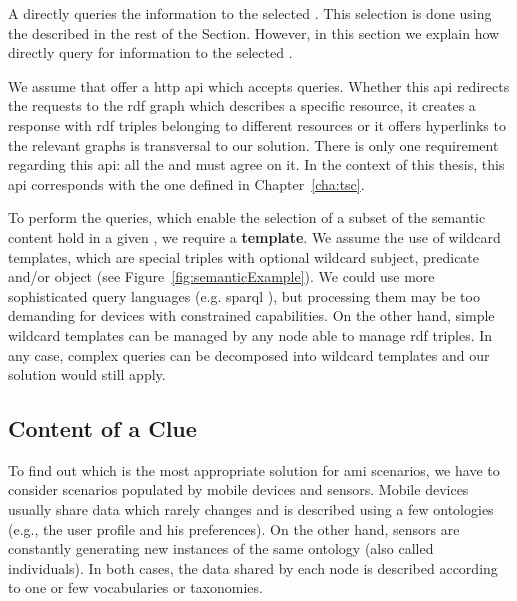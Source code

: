 A \consumer{} directly queries the information to the selected \providers{}.
This selection is done using the \clues{} described in the rest of the Section.
However, in this section we explain how \consumers{} directly query for information to the selected \providers{}.

We assume that \providers{} offer a \ac{http} \ac{api} which accepts queries. %
Whether this \ac{api} redirects the requests to the \ac{rdf} graph which describes a specific resource,
it creates a response with \ac{rdf} triples belonging to different resources or
it offers hyperlinks to the relevant graphs is transversal to our solution.
There is only one requirement regarding this \ac{api}: all the \consumers{} and \providers{} must agree on it.
In the context of this thesis, this \ac{api} corresponds with the one defined in Chapter~\ref{cha:tsc}.

To perform the queries, which enable the selection of a subset of the semantic content hold in a given \Space{}, we require a \textbf{template}.
We assume the use of wildcard templates, which are special triples with optional wildcard subject, predicate and/or object (see Figure~\ref{fig:semanticExample}). %
We could use more sophisticated query languages (e.g. \ac{sparql} ),
but processing them may be too demanding for devices with constrained capabilities.
On the other hand, simple wildcard templates can be managed by any node able to manage \ac{rdf} triples.
In any case, complex queries can be decomposed into wildcard templates and our solution would still apply.





\subsection{Content of a Clue}
To find out which is the most appropriate solution for \ac{ami} scenarios, we have to consider scenarios populated by mobile devices and sensors. %
Mobile devices usually share data which rarely changes and is described using a few ontologies (e.g., the user profile and his preferences).
On the other hand, sensors are constantly generating new instances of the same ontology (also called individuals).
In both cases, the data shared by each node is described according to one or few vocabularies or taxonomies.

